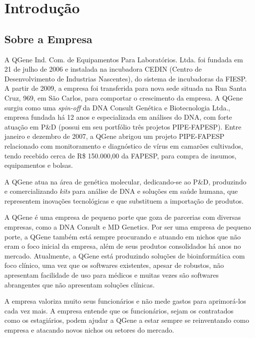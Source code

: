 \chapter{Introdução}
\label{chap:intro}

\section{Sobre a Empresa}
A QGene Ind. Com. de Equipamentos Para Laboratórios. Ltda. foi fundada em 21 de julho de 2006 e instalada 
na incubadora CEDIN (Centro de Desenvolvimento de Industrias Nascentes), do sistema de incubadoras da 
FIESP. A partir de 2009, a empresa foi transferida para nova sede situada na Rua Santa Cruz, 969, em São Carlos, 
para comportar o crescimento da empresa. A QGene surgiu como uma \textit{spin-off} da DNA Consult Genética e
Biotecnologia Ltda., empresa fundada há 12 anos e especializada em análises do DNA, com forte atuação em P\&D
(possui em seu portfólio três projetos PIPE-FAPESP). Entre janeiro e dezembro de 2007, a QGene abrigou um 
projeto PIPE-FAPESP relacionado com monitoramento e diagnóstico de vírus em camarões cultivados, tendo 
recebido cerca de R\$ 150.000,00 da FAPESP, para compra de insumos, equipamentos e bolsas.

A QGene atua na área de genética molecular, dedicando-se ao P\&D, produzindo e comercializando \textit{kits} para 
análise de DNA e soluções em saúde humana, que representem inovações tecnológicas e que substituem a 
importação de produtos.

A QGene é uma empresa de pequeno porte que goza de parcerias com diversas empresas, como a DNA Consult e MD Genetics.
Por ser uma empresa de pequeno porte, a QGene também está sempre procurando e atuando em nichos que não
eram o foco inicial da empresa, além de seus produtos consolidados há anos no mercado. Atualmente, a QGene
está produzindo soluções de bioinformática com foco clínico, uma vez que os softwares existentes, apesar
de robustos, não apresentam facilidade de uso para médicos e muitas vezes são softwares abrangentes
que não apresentam soluções clínicas.

A empresa valoriza muito seus funcionários e não mede gastos para aprimorá-los cada vez mais. A empresa entende
que os funcionários, sejam os contratados como os estagiários, podem ajudar a QGene a estar sempre se reinventando
como empresa e atacando novos nichos ou setores do mercado.

